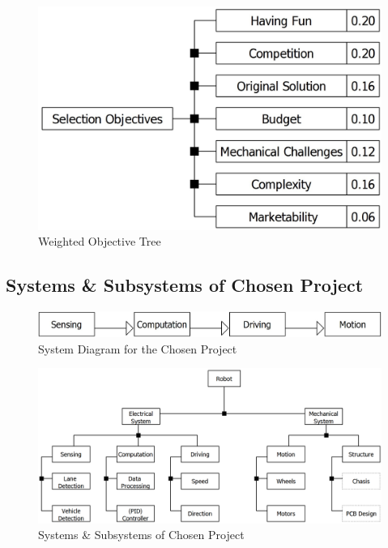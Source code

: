 \documentclass[a4paper,12pt]{article}
\begin{document}
	
	\begin{figure}[H]
		\centering
		\includegraphics[width=\textwidth,height=\textheight,keepaspectratio]{pre-objective-tree/pre-objective-tree} 
		\caption{\label{fig:objective_tree}Weighted Objective Tree}
	\end{figure}
	
	
	
	\subsection{Systems \& Subsystems of Chosen Project}	
	
	\begin{figure}[H]
		\centering
		\includegraphics[width=\textwidth,height=\textheight,keepaspectratio]{product-tree/system-flow} 
		\caption{\label{fig:system_diagram}System Diagram for the Chosen Project}
	\end{figure}
	
	
	\begin{figure}[H]
		\centering
		\includegraphics[width=\textwidth,height=\textheight,keepaspectratio]{product-tree/product-tree} 
		\caption{\label{fig:systems_project}Systems \& Subsystems of Chosen Project}
	\end{figure}
\end{document}
